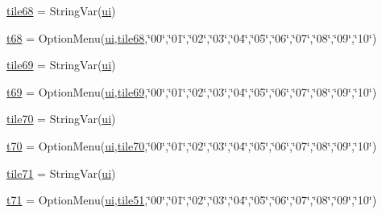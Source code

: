 \begin{DoxyCompactItemize}
\item 
\mbox{\hyperlink{namespacegui_a04d5995a5f47514361d4d9b85b41fdd4}{tile68}} = String\+Var(\mbox{\hyperlink{namespacegui_a40ab7281456eadbea2dc2038f5c24fa1}{ui}})
\item 
\mbox{\hyperlink{namespacegui_a3f63b7bb66be287743b185d084f54726}{t68}} = Option\+Menu(\mbox{\hyperlink{namespacegui_a40ab7281456eadbea2dc2038f5c24fa1}{ui}},\mbox{\hyperlink{namespacegui_a04d5995a5f47514361d4d9b85b41fdd4}{tile68}},\char`\"{}00\char`\"{},\char`\"{}01\char`\"{},\char`\"{}02\char`\"{},\char`\"{}03\char`\"{},\char`\"{}04\char`\"{},\char`\"{}05\char`\"{},\char`\"{}06\char`\"{},\char`\"{}07\char`\"{},\char`\"{}08\char`\"{},\char`\"{}09\char`\"{},\char`\"{}10\char`\"{})
\item 
\mbox{\hyperlink{namespacegui_a6246ec72785ce9baef112ad048f0ea64}{tile69}} = String\+Var(\mbox{\hyperlink{namespacegui_a40ab7281456eadbea2dc2038f5c24fa1}{ui}})
\item 
\mbox{\hyperlink{namespacegui_ae401d95cbad2f858265141e0d3b06254}{t69}} = Option\+Menu(\mbox{\hyperlink{namespacegui_a40ab7281456eadbea2dc2038f5c24fa1}{ui}},\mbox{\hyperlink{namespacegui_a6246ec72785ce9baef112ad048f0ea64}{tile69}},\char`\"{}00\char`\"{},\char`\"{}01\char`\"{},\char`\"{}02\char`\"{},\char`\"{}03\char`\"{},\char`\"{}04\char`\"{},\char`\"{}05\char`\"{},\char`\"{}06\char`\"{},\char`\"{}07\char`\"{},\char`\"{}08\char`\"{},\char`\"{}09\char`\"{},\char`\"{}10\char`\"{})
\item 
\mbox{\hyperlink{namespacegui_a7e7a0ebb979b6a2f52ea9bf6a87066b1}{tile70}} = String\+Var(\mbox{\hyperlink{namespacegui_a40ab7281456eadbea2dc2038f5c24fa1}{ui}})
\item 
\mbox{\hyperlink{namespacegui_a6c75121a75ea5a0a7eb07808732d65a8}{t70}} = Option\+Menu(\mbox{\hyperlink{namespacegui_a40ab7281456eadbea2dc2038f5c24fa1}{ui}},\mbox{\hyperlink{namespacegui_a7e7a0ebb979b6a2f52ea9bf6a87066b1}{tile70}},\char`\"{}00\char`\"{},\char`\"{}01\char`\"{},\char`\"{}02\char`\"{},\char`\"{}03\char`\"{},\char`\"{}04\char`\"{},\char`\"{}05\char`\"{},\char`\"{}06\char`\"{},\char`\"{}07\char`\"{},\char`\"{}08\char`\"{},\char`\"{}09\char`\"{},\char`\"{}10\char`\"{})
\item 
\mbox{\hyperlink{namespacegui_a177274f43bd23db55e5f2e0a5ecaa6b3}{tile71}} = String\+Var(\mbox{\hyperlink{namespacegui_a40ab7281456eadbea2dc2038f5c24fa1}{ui}})
\item 
\mbox{\hyperlink{namespacegui_afdfbe202fdd7200450cbece171280f0f}{t71}} = Option\+Menu(\mbox{\hyperlink{namespacegui_a40ab7281456eadbea2dc2038f5c24fa1}{ui}},\mbox{\hyperlink{namespacegui_ad2c1b5064cba842f7abd0322229ca355}{tile51}},\char`\"{}00\char`\"{},\char`\"{}01\char`\"{},\char`\"{}02\char`\"{},\char`\"{}03\char`\"{},\char`\"{}04\char`\"{},\char`\"{}05\char`\"{},\char`\"{}06\char`\"{},\char`\"{}07\char`\"{},\char`\"{}08\char`\"{},\char`\"{}09\char`\"{},\char`\"{}10\char`\"{})

\end{DoxyCompactItemize}
